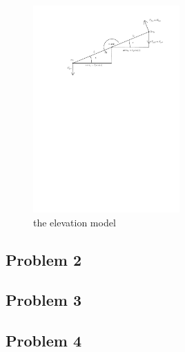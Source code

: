 \begin{figure}[H]
\caption{the elevation model}
\label{fig:elevation_model}
\includegraphics[width=0.5\textwidth]{images/elevation_model}
\end{figure}

\subsection{Problem 2}
\subsection{Problem 3}
\subsection{Problem 4}
